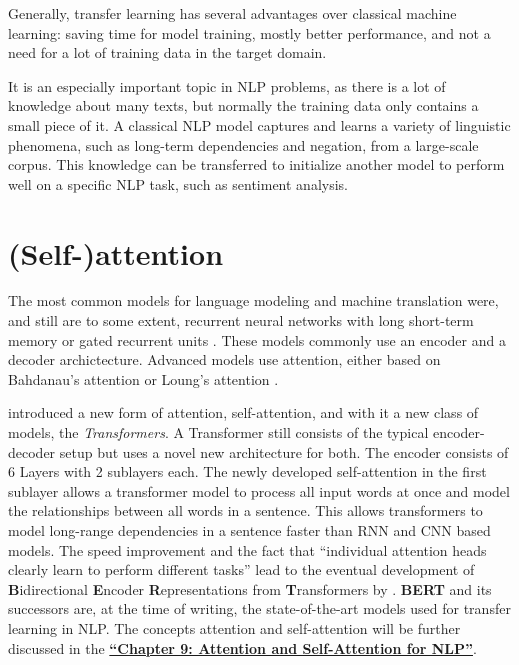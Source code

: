 \documentclass[]{krantz}
\begin{document}
Generally, transfer learning has several advantages over classical machine learning: saving time for model training, mostly better performance, and not a need for a lot of training data in the target domain.

It is an especially important topic in NLP problems, as there is a lot of knowledge about many texts, but normally the training data only contains a small piece of it. A classical NLP model captures and learns a variety of linguistic phenomena, such as long-term dependencies and negation, from a large-scale corpus. This knowledge can be transferred to initialize another model to perform well on a specific NLP task, such as sentiment analysis. \citep{evolutiontransferlearning}

\hypertarget{self-attention}{%
\section{(Self-)attention}\label{self-attention}}

The most common models for language modeling and machine translation were, and still are to some extent, recurrent neural networks with long short-term memory \citep{hochreiter1997long} or gated recurrent units \citep{gru}. These models commonly use an encoder and a decoder archictecture. Advanced models use attention, either based on Bahdanau's attention \citep{bahdanau2014neural} or Loung's attention \citep{luong2015effective}.

\citet{vaswani2017attention} introduced a new form of attention, self-attention, and with it a new class of models, the \textit{Transformers}. A Transformer still consists of the typical encoder-decoder setup but uses a novel new architecture for both. The encoder consists of 6 Layers with 2 sublayers each. The newly developed self-attention in the first sublayer allows a transformer model to process all input words at once and model the relationships between all words in a sentence. This allows transformers to model long-range dependencies in a sentence faster than RNN and CNN based models. The speed improvement and the fact that ``individual attention heads clearly learn to perform different tasks'' \citet{vaswani2017attention} lead to the eventual development of \textbf{B}idirectional \textbf{E}ncoder \textbf{R}epresentations from \textbf{T}ransformers by \citet{bert}. \textbf{BERT} and its successors are, at the time of writing, the state-of-the-art models used for transfer learning in NLP. The concepts attention and self-attention will be further discussed in the \protect\hyperlink{Attention-and-self-Attention-for-nlp}{\textbf{``Chapter 9: Attention and Self-Attention for NLP''}}.
\end{document}
